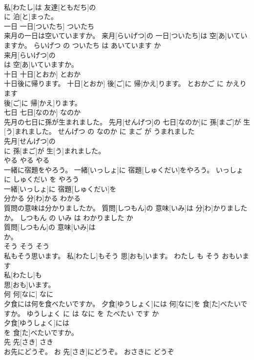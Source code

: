 \documentclass[8pt]{extreport}
\begin{document}
\begin{CJK}{UTF8}{min}
\\	私[わたし]は 友達[ともだち]の
\\	に 泊[と]まった。			
\\	一日	一日[ついたち]	ついたち	
\\	来月の一日は空いていますか。	来月[らいげつ]の 一日[ついたち]は 空[あ]いていますか。	らいげつ の ついたち は あいています か	
\\	来月[らいげつ]の
\\	は 空[あ]いていますか。			
\\	十日	十日[とおか]	とおか	
\\	十日後に帰ります。	十日[とおか] 後[ご]に 帰[かえ]ります。	とおかご に かえります	
\\	後[ご]に 帰[かえ]ります。			
\\	七日	七日[なのか]	なのか	
\\	先月の七日に孫が生まれました。	先月[せんげつ]の 七日[なのか]に 孫[まご]が 生[う]まれました。	せんげつ の なのか に まご が うまれました	
\\	先月[せんげつ]の
\\	に 孫[まご]が 生[う]まれました。			
\\	やる	やる	やる	
\\	一緒に宿題をやろう。	一緒[いっしょ]に 宿題[しゅくだい]をやろう。	いっしょ に しゅくだい を やろう	
\\	一緒[いっしょ]に 宿題[しゅくだい]を
\\	分かる	分[わ]かる	わかる	
\\	質問の意味は分かりましたか。	質問[しつもん]の 意味[いみ]は 分[わ]かりましたか。	しつもん の いみ は わかりました か	
\\	質問[しつもん]の 意味[いみ]は
\\	か。			
\\	そう	そう	そう	
\\	私もそう思います。	私[わたし]もそう 思[おも]います。	わたし も そう おもいます	
\\	私[わたし]も
\\	思[おも]います。			
\\	何	何[なに]	なに	
\\	夕食には何を食べたいですか。	夕食[ゆうしょく]には 何[なに]を 食[た]べたいですか。	ゆうしょく に は なに を たべたい です か	
\\	夕食[ゆうしょく]には
\\	を 食[た]べたいですか。			
\\	先	先[さき]	さき	
\\	お先にどうぞ。	お 先[さき]にどうぞ。	おさきに どうぞ	

\end{CJK}
\end{document}
